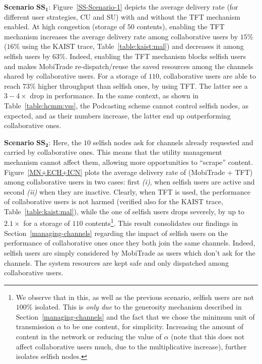 \noindent \textbf{Scenario} $\mathbf{SS_1}$:  Figure~\ref{SS-Scenario-1} depicts the average delivery rate (for different user strategies, CU and SU) with and without the TFT mechanism enabled. At high congestion (storage of $50$ contents), enabling the TFT mechanism increases the average delivery rate among collaborative users by $15\%$ ($16\%$ using the KAIST trace, Table~\ref{table:kaist:mal}) and decreases it among selfish users by $63\%$. Indeed, enabling the TFT mechanism blocks selfish users and makes MobiTrade re-dispatch/reuse the saved resources among the channels shared by collaborative users. For a storage of $110$, collaborative users are able to reach  $73\%$ higher throughput than selfish ones, by using TFT. The latter see a $3-4\times$ drop in performance.  In the same context, as shown in Table~\ref{table:hcmm:vss}, the Podcasting scheme cannot control selfish nodes, as expected, and as their numbers increase, the latter end up outperforming collaborative ones. 

\noindent \textbf{Scenario} $\mathbf{SS_2}$: Here, the $10$ selfish nodes ask for channels already requested and carried by collaborative ones. This means that the utility management mechanism cannot affect them, allowing more opportunities to ``scrape'' content. Figure~\ref{MN+ECH+ICN} plots the average delivery rate of (MobiTrade + TFT) among collaborative users in two cases: first \emph{(i)}, when selfish users are active and second \emph{(ii)} when they are inactive. Clearly, when TFT is used, the performance of collaborative users is not harmed (verified also for the KAIST trace, Table~\ref{table:kaist:mal}), while the one of selfish users drops severely, by up to $2.1\times$ for a storage of $110$ contents\footnote{We observe that in this, as well as the previous scenario, selfish users are not $100\%$ isolated. This is \emph{only due} to the generosity mechanism described in Section~\ref{managing-channels} and the fact that we chose the minimum unit of transmission $\alpha$ to be one content, for simplicity. Increasing the amount of content in the network or reducing the value of $\alpha$ (note that this does not affect collaborative users much, due to the multiplicative increase), further isolates selfish nodes.}. This result consolidates our findings in Section~\ref{managing-channels} regarding the impact of selfish users on the performance of collaborative ones once they both join the same channels. Indeed, selfish users are simply considered by MobiTrade as users which don't ask for the channels. The system resources are kept safe and only dispatched among collaborative users.


